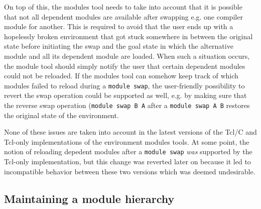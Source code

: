 On top of this, the modules tool needs to take into account that it is
possible that not all dependent modules are available after swapping e.g.
one compiler module for another. This is required to avoid that the user
ends up with a hopelessly broken environment that got stuck somewhere in
between the original state before initiating the swap and the goal state
in which the alternative module and all its dependent module are loaded.
When such a situation occurs, the module tool should simply notify the user
that certain dependent modules could not be reloaded. If the modules tool
can somehow keep track of which modules failed to reload during a
\texttt{module swap}, the user-friendly possibility to revert the swap
operation could be supported as well, e.g. by making sure that the reverse
swap operation (\texttt{module swap B A} after a \texttt{module swap A B}
restores the original state of the environment.

None of these issues are taken into account in the latest versions of the
Tcl/C and Tcl-only implementations of the environment modules tools. At some point,
the notion of reloading depedent modules after a \texttt{module swap}
\emph{was} supported by the Tcl-only implementation, but this change was
reverted later on because it led to incompatible behavior between
these two versions which was deemed undesirable.




\subsection{Maintaining a module hierarchy}
\label{sec:maintaining_a_hierarchy}

